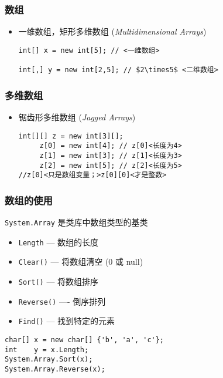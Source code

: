 \begin{frame}[fragile]
\frametitle{数组}
\begin{itemize}
\item 一维数组，矩形多维数组 (\textit{Multidimensional Arrays})
\begin{lstlisting}[escapeinside=<>,mathescape]
int[] x = new int[5]; // <一维数组>

int[,] y = new int[2,5]; // $2\times5$ <二维数组>
\end{lstlisting}
\end{itemize} \pause

  \begin{figure}[h] \label<1| handout:1>{fig:cs-array-mul} \centering
    
  \end{figure}
\end{frame}


\begin{frame}[fragile]
\frametitle{多维数组}
\begin{itemize}
\item 锯齿形多维数组 (\textit{Jagged Arrays})
\begin{lstlisting}[escapeinside=<>]
int[][] z = new int[3][];
     z[0] = new int[4]; // z[0]<长度为4>
     z[1] = new int[3]; // z[1]<长度为3>
     z[2] = new int[5]; // z[2]<长度为5>
//z[0]<只是数组变量；>z[0][0]<才是整数>

\end{lstlisting}
\end{itemize} \pause

  \begin{figure}[h] \label<1| handout:1>{fig:cs-array-rec}
    \centering 
  \end{figure}
\end{frame}

\begin{frame}[fragile]
\frametitle{数组的使用}
\texttt{System.Array} 是类库中数组类型的基类

\begin{itemize}
\item \texttt{Length} --- 数组的长度
\item \texttt{Clear()} --- 将数组清空 (0 或 null)
\item \texttt{Sort()} --- 将数组排序
\item \texttt{Reverse()} ---- 倒序排列
\item \texttt{Find()} --- 找到特定的元素
\end{itemize}
\begin{lstlisting}
char[] x = new char[] {'b', 'a', 'c'};
int    y = x.Length;
System.Array.Sort(x);
System.Array.Reverse(x);
\end{lstlisting}

\end{frame}

